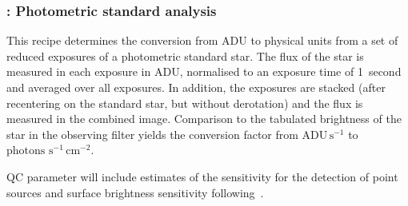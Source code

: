 %
%
%

\subsubsection{:  Photometric standard analysis}
\label{lm_img_photstd}
\label{rec:lm_img_photstd}
\label{sssec:lm_img_photstd}

This recipe determines the conversion from ADU to physical units from
a set of reduced exposures of a photometric standard star. The flux of
the star is measured in each exposure in ADU, normalised to an
exposure time of 1~second and averaged over all exposures. In
addition, the exposures are stacked (after recentering on the standard
star, but without derotation) and the flux is measured in the combined
image. Comparison to the tabulated brightness of the star in the
observing filter yields the conversion factor from
$\mathrm{ADU\,s^{-1}}$ to $\mathrm{photons\,\,s^{-1}\,cm^{-2}}$.

QC parameter will include estimates of the sensitivity for the
detection of point sources and surface brightness sensitivity
following~\cite{visir_manual}.

